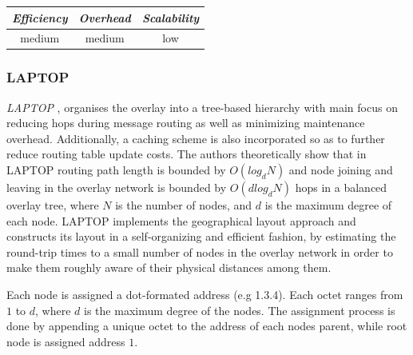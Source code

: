 \begin{center}
\begin{tabular}{ccc}
\emph{Efficiency} & \emph{Overhead} & \emph{Scalability} \\
\hline
medium &
medium &
low
\end{tabular}
\end{center}

\subsubsection{LAPTOP}
\emph{LAPTOP} \cite{WLH2007}, organises the overlay into a tree-based hierarchy
with main focus on reducing hops during message routing as well as minimizing
maintenance overhead. Additionally, a caching scheme is also incorporated so as
to further reduce routing table update costs. The authors theoretically show
that in LAPTOP routing path length is bounded by $O(log_d N)$ and node joining
and leaving in the overlay network is bounded by $O\left( d log_d N \right)$
hops in a balanced overlay tree, where $N$ is the number of nodes, and $d$ is
the maximum degree of each node. LAPTOP implements the geographical layout
approach  and constructs its layout in a self-organizing and efficient fashion,
by estimating the round-trip times to a small number of nodes in the overlay
network in order to make them roughly aware of their physical distances among
them.

Each node is assigned a dot-formated address (e.g 1.3.4). Each octet ranges from
$1$ to $d$, where $d$ is the maximum degree of the nodes. The assignment process
is done by appending a unique octet to the address of each nodes parent, while
root node is assigned address $1$.

